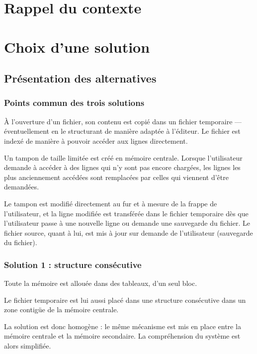 
\section{Rappel du contexte}


\section{Choix d'une solution}
\subsection{Présentation des alternatives}

\subsubsection{Points commun des trois solutions}
À l'ouverture d'un fichier, son contenu est copié dans un fichier temporaire --- éventuellement en le structurant de manière adaptée à l'éditeur. Le fichier est indexé de manière à pouvoir accéder aux lignes directement.

Un tampon de taille limitée est créé en mémoire centrale. Lorsque l'utilisateur demande à accéder à des lignes qui n'y sont pas encore chargées, les lignes les plus anciennement accédées sont remplacées par celles qui viennent d'être demandées.

Le tampon est modifié directement au fur et à mesure de la frappe de l'utilisateur, et la ligne modifiée est transférée dans le fichier temporaire dès que l'utilisateur passe à une nouvelle ligne ou demande une sauvegarde du fichier. Le fichier source, quant à lui, est mis à jour sur demande de l'utilisateur (sauvegarde du fichier).

\subsubsection{Solution 1 : structure consécutive}
Toute la mémoire est allouée dans des tableaux, d'un seul bloc.

Le fichier temporaire est lui aussi placé dans une structure consécutive dans
un zone contigüe de la mémoire centrale.

La solution est donc homogène : le même mécanisme est mis en place entre la
mémoire centrale et la mémoire secondaire. La compréhension du système est
alors simplifiée.

